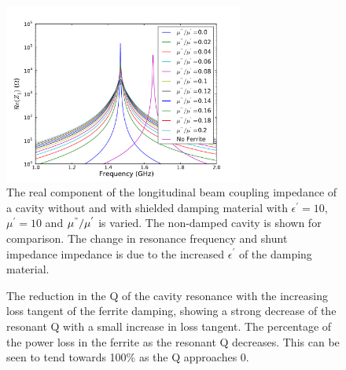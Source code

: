 \begin{figure}
\begin{center}
\includegraphics[width=0.7\textwidth]{Beam_Coupling_Impedance_Reduction_Techniques/figures/screen_long_imp_all.pdf}
\end{center}
\caption{The real component of the longitudinal beam coupling impedance of a cavity without and with shielded damping material with $\epsilon^{'}=10$, $\mu^{'}=10$ and $\mu^{"}/\mu^{'}$ is varied. The non-damped cavity is shown for comparison. The change in resonance frequency and shunt impedance impedance is due to the increased $\epsilon^{'}$ of the damping material.}
\label{fig:screen_long_imp}
\end{figure}


\begin{figure}
\caption{ The reduction in the Q of the cavity resonance with the increasing loss tangent of the ferrite damping, showing a strong decrease of the resonant Q with a small increase in loss tangent.  The percentage of the power loss in the ferrite as the resonant Q decreases. This can be seen to tend towards 100\% as the Q approaches 0.}
\label{fig:screen_res_alterations}
\end{figure}

